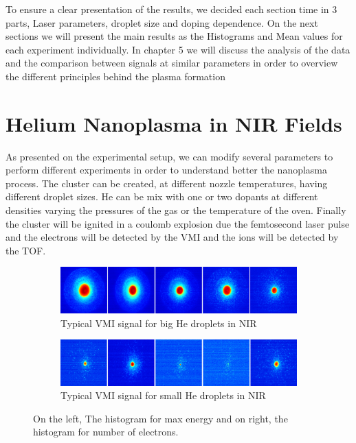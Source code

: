 To ensure a clear presentation of the results, we decided each section time in 3 parts, Laser parameters, droplet size and doping  dependence. On the next sections we will present the main results as the Histograms and Mean values for each experiment individually. In chapter 5 we will discuss the analysis of the data and the comparison between signals at similar parameters in order to overview the different principles behind the plasma formation

\section{Helium Nanoplasma in NIR Fields}

As presented on the experimental setup, we can modify several parameters to perform different experiments in order to understand better the nanoplasma process. The cluster can be created, at different nozzle temperatures, having different droplet sizes. He can be mix with one or two dopants at different densities varying the pressures of the gas or the temperature of the oven. Finally the cluster will be ignited in a coulomb explosion due the femtosecond laser pulse and the electrons will be detected by the VMI and the ions will be detected by the TOF. 

\begin{figure}[h!]
\centering
\begin{subfigure}[l]{0.7\textwidth}
\caption{Typical VMI signal for big He droplets in NIR}
\includegraphics[width=1\textwidth]{../Images/results/NI_He_Dropletsize/RAW_NIR_HE_dropletsizeBigg.png}   				\end{subfigure}
\begin{subfigure}[l]{0.7\textwidth}
\caption{Typical VMI signal for small He droplets in NIR}
\includegraphics[width=1\textwidth]{../Images/results/NI_He_Dropletsize/RAW_NIR_HE_dropletsizeSmall.png} 
\end{subfigure}
\caption[MIR He droplet scan histograms]{On the left, The histogram for max energy and on right, the histogram for number of electrons.}
\label{fig:NIRsample}
\end{figure}

